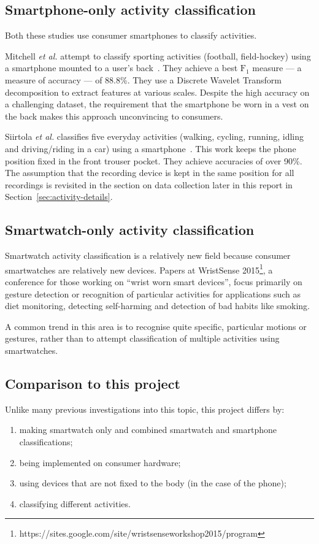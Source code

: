     \subsection{Smartphone-only activity classification}
      Both these studies use consumer smartphones to classify activities. 
      
      Mitchell \emph{et al.} attempt to classify sporting activities (football, field-hockey) using a smartphone mounted to a user's back~\cite{mitchell2013classification}. They achieve a best $\mathrm{F}_1$ measure --- a measure of accuracy --- of 88.8\%. They use a Discrete Wavelet Transform decomposition to extract features at various scales. Despite the high accuracy on a challenging dataset, the requirement that the smartphone be worn in a vest on the back makes this approach unconvincing to consumers.
      
      Siirtola \emph{et al.} classifies five everyday activities (walking, cycling, running, idling and driving/riding in a car) using a smartphone~\cite{siirtola2012recognizing}. This work keeps the phone position fixed in the front trouser pocket. They achieve accuracies of over 90\%. The assumption that the recording device is kept in the same position for all recordings is revisited in the section on data collection later in this report in Section~\ref{sec:activity-details}.
    \subsection{Smartwatch-only activity classification}
      Smartwatch activity classification is a relatively new field because consumer smartwatches are relatively new devices. Papers at WristSense 2015\footnote{https://sites.google.com/site/wristsenseworkshop2015/program}, a conference for those working on ``wrist worn smart devices'', focus primarily on gesture detection or recognition of particular activities for applications such as diet monitoring, detecting self-harming and detection of bad habits like smoking.
      
      A common trend in this area is to recognise quite specific, particular motions or gestures, rather than to attempt classification of multiple activities using smartwatches.
    \subsection{Comparison to this project}
      Unlike many previous investigations into this topic, this project differs by:
        \begin{enumerate}
          \item making smartwatch only and combined smartwatch and smartphone classifications;
          \item being implemented on consumer hardware;
          \item using devices that are not fixed to the body (in the case of the phone);
          \item classifying different activities.
        \end{enumerate}
    
    
